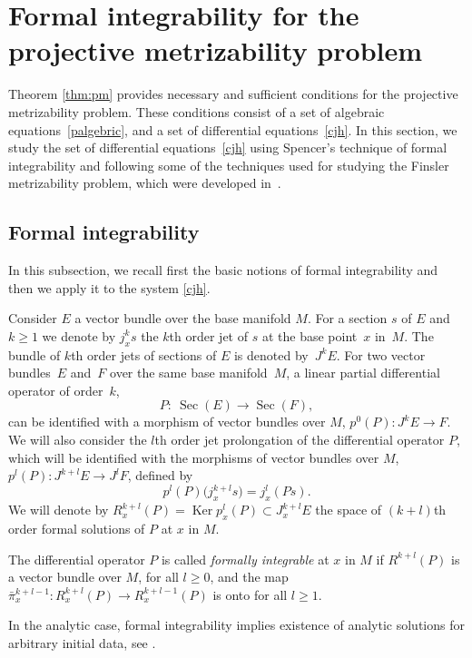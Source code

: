 \documentclass[pdftex]{sigma}
\numberwithin{equation}{section}
\begin{document}
\section{Formal integrability for the projective metrizability problem}
\label{sec:fi}

Theorem \ref{thm:pm} provides necessary and suf\/f\/icient conditions for the projective
metrizability problem. These conditions consist of a set of algebraic equations~\eqref{palgebric},
and a set of dif\/ferential equations~\eqref{cjh}. In this section,
we study the set of dif\/ferential equations~\eqref{cjh} using Spencer's
technique of formal integrability \cite{BCG91, grifone00}  and following some of the techniques
used for studying the Finsler metrizability problem, which were developed in~\cite{muzsnay06}.


\subsection{Formal integrability} \label{subsec:fi}
In this subsection, we recall f\/irst the basic notions of formal integrability
\cite{BCG91, grifone00} and then we apply it to the system \eqref{cjh}.

Consider $E$ a vector bundle over the base manifold $M$. For a
section $s$ of $E$ and $k\geq 1$ we denote by $j^k_xs$ the $k$th
order jet of $s$ at the base point~$x$ in~$M$. The bundle of $k$th
order jets of sections of $E$ is denoted by~$J^kE$. For two vector
bundles~$E$ and~$F$ over the same base manifold~$M$, a linear
partial dif\/ferential operator of order~$k$,
\[
P: \  \operatorname{Sec}(E) \to \operatorname{Sec}(F),
\]  can be identif\/ied with a morphism of vector
bundles over $M$, $p^{0}(P): J^{k}E \to
F$. We will also consider the $l$th order jet prolongation of the dif\/ferential
operator $P$, which will be identif\/ied with the morphisms of vector bundles
over $M$, $p^{l}(P): J^{k+l}E \to J^lF$, def\/ined by
\[
p^{l}(P)\big(j^{k+l}_xs\big)=j^l_x(Ps).
\] We will denote by
$R^{k+l}_x(P)=\operatorname{Ker} p_x^{l}(P)\subset J^{k+l}_xE$ the
space of $(k+l)$th order formal solutions of $P$ at $x$ in $M$.
\begin{Definition} \label{def:fi} The dif\/ferential operator $P$ is called \emph{formally integrable} at
$x$ in $M$ if $R^{k+l}(P)$ is a vector bundle over $M$, for all $l\geq 0$,
and the map $\bar{\pi}^{k+l-1}_x: R^{k+l}_x(P) \to R^{k+l-1}_x(P)$ is onto for all
$l\geq 1$. \end{Definition}
In the analytic case, formal integrability implies
existence of analytic solutions for arbitrary initial data, see
\cite[p.~397]{BCG91}.
\end{document}

